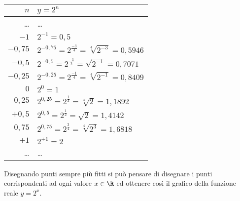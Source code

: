  \begin{minipage}[]{.48\textwidth}
  \begin{center}
  \renewcommand\arraystretch{1.3}
   \begin{tabular}{r|l}
    \(n\)   & \(y=2^n\) \\
    \hline
    \dots & \dots \\
    \(-1\) & \(2^{-1} = 0,5\) \\
    \(-0,75\) & \(2^{-0,75} = 2^{\frac{-3}{4}} = \sqrt[4]{2^{-3}} = 
0,5946\) \\
    \(-0,5\) & \(2^{-0,5} = 2^{\frac{-1}{2}} = \sqrt{2^{-1}} = 0,7071\) \\
    \(-0,25\) & \(2^{-0,25} = 2^{\frac{-1}{4}} = \sqrt[4]{2^{-1}} = 
0,8409\) \\
    \(0\) & \(2^{0} = 1\) \\
    \(0,25\) & \(2^{0,25} = 2^{\frac{1}{4}} = \sqrt[4]{2} = 1,1892\) \\
    \(+0,5\) & \(2^{0,5} = 2^{\frac{1}{2}} = \sqrt{2} = 1,4142\) \\
    \(0,75\) & \(2^{0,75} = 2^{\frac{3}{4}} = \sqrt[4]{2^3} = 1,6818\) \\
    \(+1\) & \(2^{+1} = 2\) \\
    \dots & \dots \\
   \end{tabular}
  \end{center}
 \end{minipage}
\begin{minipage}[]{.48\textwidth}
\begin{center}
\begin{inaccessibleblock}
  \puntib
\end{inaccessibleblock}
\end{center}
\end{minipage}

Disegnando punti sempre più fitti si può pensare di disegnare i punti 
corrispondenti ad ogni valore \(x \in \R\) ed ottenere così il grafico 
della funzione reale \(y=2^x\).

